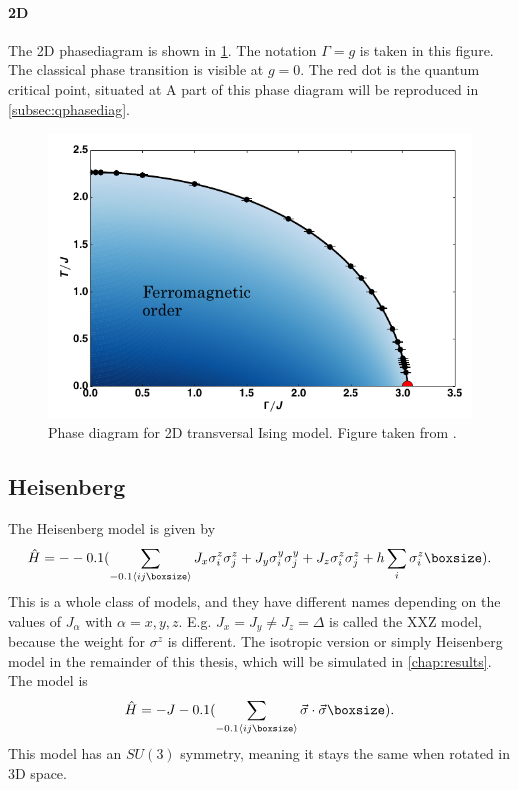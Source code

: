 \paragraph{2D}

The 2D phasediagram is shown in \cref{2dtisingphasediag}. The notation $\Gamma=g$ is taken in this figure. The classical phase transition is visible at $g=0$. The red dot is the quantum critical point, situated at  A part of this phase diagram will be reproduced in \cref{subsec:qphasediag}.

\begin{figure}[H]
    \center
    \includegraphics[width=\textwidth]{Figuren/phsyics/2disingphase.png}
    \caption{Phase diagram for 2D transversal Ising model. Figure taken from \cite{Hesselmann2016}.}
    \label{2dtisingphasediag}
\end{figure}

\subsection{Heisenberg}

The Heisenberg model is given by
\begin{equation}
    \hat{H} =  -\left( \sum_{\Braket{i j }} J_x \sigma^z_i \sigma^z_j + J_y \sigma^y_i \sigma^y_j+ J_z \sigma^z_i \sigma^z_j + h \sum_i \sigma^z_i \right ).
\end{equation}
This is a whole class of models, and they have different names depending on the values of $J_{\alpha} $ with $\alpha=x,y,z$. E.g. $J_x = J_y \neq J_z = \Delta$ is called the XXZ model, because the weight for $\sigma^z$ is different. The isotropic version or simply Heisenberg model in the remainder of this thesis, which will be simulated in \cref{chap:results}. The model is
\begin{equation}
    \hat{H} =  -J \left( \sum_{\Braket{i j }} \vec{\sigma} \cdot \vec{\sigma} \right ).
\end{equation}
This model has an $SU(3)$ symmetry, meaning it stays the same when rotated in 3D space.

